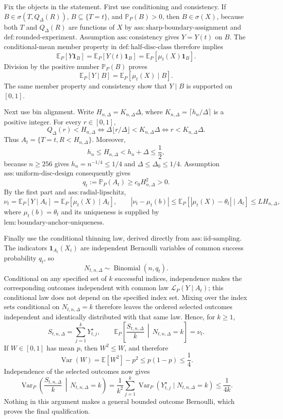 Fix the objects in the statement.  First use conditioning and consistency.  If \(B\in\sigma(T,Q_\Delta(R))\), \(B\subseteq\{T=t\}\), and \(\mathbb P_P(B)>0\), then \(B\in\sigma(X)\), because both \(T\) and \(Q_\Delta(R)\) are functions of \(X\) by \(\mathrm{ass:sharp\text{-}boundary\text{-}assignment}\) and \(\mathrm{def:rounded\text{-}experiment}\).  Assumption \(\mathrm{ass:consistency}\) gives \(Y=Y(t)\) on \(B\).  The conditional-mean member property in \(\mathrm{def:half\text{-}disc\text{-}class}\) therefore implies
\[
 \mathbb E_P[Y\mathbf1_B]
 =\mathbb E_P[Y(t)\mathbf1_B]
 =\mathbb E_P[\mu_t(X)\mathbf1_B].
\]
Division by the positive number \(\mathbb P_P(B)\) proves
\[
 \mathbb E_P[Y\mid B]=\mathbb E_P[\mu_t(X)\mid B].
\]
The same member property and consistency show that \(Y\mid B\) is supported on \([0,1]\).

Next use bin alignment.  Write \(H_{n,\Delta}=K_{n,\Delta}\Delta\), where \(K_{n,\Delta}=\lceil h_n/\Delta\rceil\) is a positive integer.  For every \(r\in[0,1]\),
\[
 Q_\Delta(r)<H_{n,\Delta}
 \iff \Delta\lfloor r/\Delta\rfloor<K_{n,\Delta}\Delta
 \iff r<K_{n,\Delta}\Delta.
\]
Thus \(A_t=\{T=t,R<H_{n,\Delta}\}\).  Moreover,
\[
 h_n\le H_{n,\Delta}<h_n+\Delta\le\frac12,
\]
because \(n\ge256\) gives \(h_n=n^{-1/4}\le1/4\) and \(\Delta\le\Delta_0\le1/4\).  Assumption \(\mathrm{ass:uniform\text{-}disc\text{-}design}\) consequently gives
\[
 q_t:=\mathbb P_P(A_t)\ge c_0H_{n,\Delta}^2>0.
\]
By the first part and \(\mathrm{ass:radial\text{-}lipschitz}\),
\[
 \nu_t=\mathbb E_P[Y\mid A_t]
 =\mathbb E_P[\mu_t(X)\mid A_t],
 \qquad
 |\nu_t-\mu_t(b)|
 \le \mathbb E_P[|\mu_t(X)-\theta_t|\mid A_t]
 \le LH_{n,\Delta},
\]
where \(\mu_t(b)=\theta_t\) and its uniqueness is supplied by \(\mathrm{lem:boundary\text{-}anchor\text{-}uniqueness}\).

Finally use the conditional thinning law, derived directly from \(\mathrm{ass:iid\text{-}sampling}\).  The indicators \(\mathbf1_{A_t}(X_i)\) are independent Bernoulli variables of common success probability \(q_t\), so
\[
 N_{t,n,\Delta}\sim\operatorname{Binomial}(n,q_t).
\]
Conditional on any specified set of \(k\) successful indices, independence makes the corresponding outcomes independent with common law \(\mathcal L_P(Y\mid A_t)\); this conditional law does not depend on the specified index set.  Mixing over the index sets conditional on \(N_{t,n,\Delta}=k\) therefore leaves the ordered selected outcomes independent and identically distributed with that same law.  Hence, for \(k\ge1\),
\[
 S_{t,n,\Delta}=\sum_{j=1}^kY_{t,j}^{\star},
 \qquad
 \mathbb E_P\!\left[\frac{S_{t,n,\Delta}}k\,\middle|\,N_{t,n,\Delta}=k\right]=\nu_t.
\]
If \(W\in[0,1]\) has mean \(p\), then \(W^2\le W\), and therefore
\[
 \operatorname{Var}(W)=\mathbb E[W^2]-p^2\le p(1-p)\le\frac14.
\]
Independence of the selected outcomes now gives
\[
 \operatorname{Var}_P\!\left(\frac{S_{t,n,\Delta}}k\,\middle|\,N_{t,n,\Delta}=k\right)
 =\frac1{k^2}\sum_{j=1}^k\operatorname{Var}_P(Y_{t,j}^{\star}\mid N_{t,n,\Delta}=k)
 \le\frac1{4k}.
\]
Nothing in this argument makes a general bounded outcome Bernoulli, which proves the final qualification.